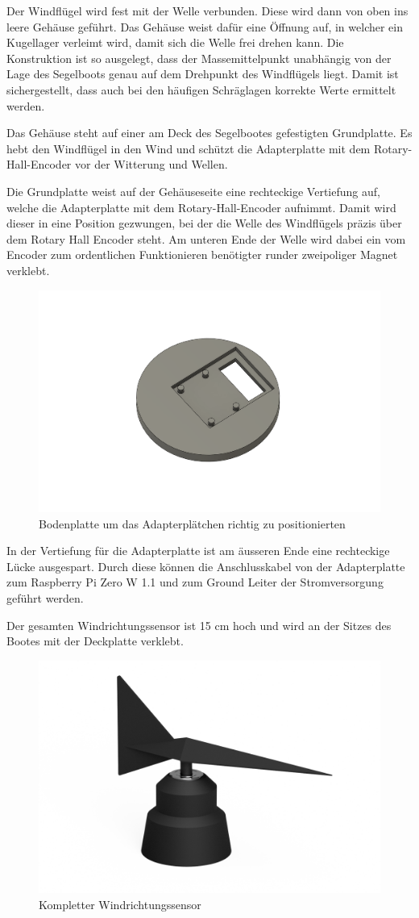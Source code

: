Der Windflügel wird fest mit der Welle verbunden. Diese wird dann von oben ins leere Gehäuse geführt. Das Gehäuse weist dafür eine Öffnung auf, in welcher ein Kugellager verleimt wird, damit sich die Welle frei drehen kann. Die Konstruktion ist so ausgelegt, dass der Massemittelpunkt unabhängig von der Lage des Segelboots genau auf dem Drehpunkt des Windflügels liegt. Damit ist sichergestellt, dass auch bei den häufigen Schräglagen korrekte Werte ermittelt werden.

Das Gehäuse steht auf einer am Deck des Segelbootes gefestigten Grundplatte. Es hebt den Windflügel in den Wind und schützt die Adapterplatte mit dem Rotary-Hall-Encoder vor der Witterung und Wellen.

Die Grundplatte weist auf der Gehäuseseite eine rechteckige Vertiefung auf, welche die Adapterplatte mit dem Rotary-Hall-Encoder aufnimmt. Damit wird dieser in eine Position gezwungen, bei der die Welle des Windflügels präzis über dem Rotary Hall Encoder steht. Am unteren Ende der Welle wird dabei ein vom Encoder zum ordentlichen Funktionieren benötigter runder zweipoliger Magnet verklebt.
\begin{figure}[H]
    \centering
    \includegraphics[width=0.5\linewidth]{assets/image.png}
    \caption{Bodenplatte um das Adapterplätchen richtig zu positionierten}
    
\end{figure}
In der Vertiefung für die Adapterplatte ist am äusseren Ende eine rechteckige Lücke ausgespart. Durch diese können die Anschlusskabel von der Adapterplatte zum Raspberry Pi Zero W 1.1 und zum Ground Leiter der Stromversorgung geführt werden. 

Der gesamten Windrichtungssensor ist 15 cm hoch und wird an der Sitzes des Bootes mit der Deckplatte verklebt.
\begin{figure}[H]
    \centering
    \includegraphics[width=0.75\linewidth]{assets/full_wind_sensor.png}
    \caption{Kompletter Windrichtungssensor}
    \label{fig:enter-label}
\end{figure}

